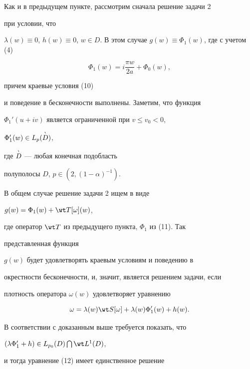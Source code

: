 \begin{pf}


Как и в предыдущем пункте, рассмотрим сначала решение задачи 2


при условии, что


$\lambda(w) \equiv 0$, $h(w) \equiv 0$, $w \in D$. В этом случае $g(w)


\equiv \Phi_1(w)$, где с учетом (4)


\begin{equation}


\Phi_1(w) = i\frac{\pi w}{2a} + \Phi_0(w),


\end{equation}


причем краевые условия (10)


и поведение в бесконечности выполнены. Заметим, что функция


$\Phi_1'(u + iv)$ является ограниченной при $v \leq v_0 < 0$,


$\Phi_1'(w) \in L_p(\overset{\scriptscriptstyle\backprime}{D}{})$,


где $\overset{\scriptscriptstyle\backprime}{D}{}$ --- любая конечная подобласть


полуполосы $D$, $p \in (2, (1 - \alpha)^{-1})$.





В общем случае решение задачи 2 ищем в виде


$g(w) = \Phi_1(w) + \wt T [\omega](w)$,


где оператор $\wt T$ из предыдущего пункта, $\Phi_1$ из (11). Так


представленная функция


$g(w)$ будет удовлетворять краевым условиям и поведению в


окрестности бесконечности, и, значит, является решением задачи, если


плотность оператора $\omega(w)$ удовлетворяет уравнению


\begin{equation}


\omega = \lambda(w) \wt S[\omega] + \lambda(w) \Phi_1'(w) + h(w).


\end{equation}


В соответствии с доказанным выше требуется показать, что


$(\lambda \Phi'_1 + h) \in L_{p_0}(D) \bigcap \wt L^1 (D)$,


и тогда уравнение (12) имеет единственное решение


\begin{equation}



\end{equation}
\end{pf}
